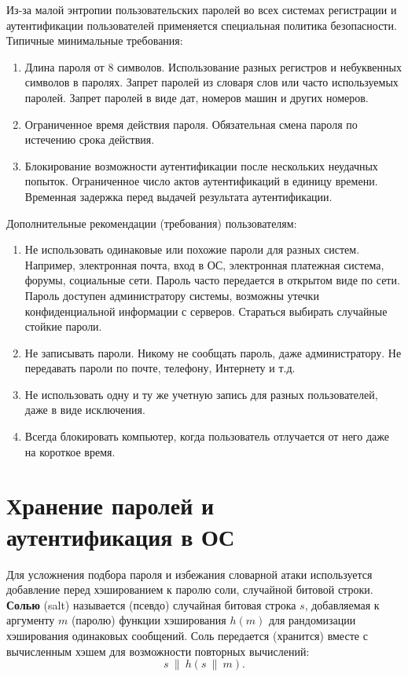 \documentclass[10pt,a4paper]{book}
\begin{document}
Из-за малой энтропии пользовательских паролей во всех системах регистрации и аутентификации пользователей применяется специальная политика безопасности. Типичные минимальные требования:
\begin{enumerate}
    \item Длина пароля от 8 символов. Использование разных регистров и небуквенных символов в паролях. Запрет паролей из словаря слов или часто используемых паролей. Запрет паролей в виде дат, номеров машин и других номеров.
    \item Ограниченное время действия пароля. Обязательная смена пароля по истечению срока действия.
    \item Блокирование возможности аутентификации после нескольких неудачных попыток. Ограниченное число актов аутентификаций в единицу времени. Временная задержка перед выдачей результата аутентификации.
\end{enumerate}

Дополнительные рекомендации (требования) пользователям:
\begin{enumerate}
    \item Не использовать одинаковые или похожие пароли для разных систем. Например, электронная почта, вход в ОС, электронная платежная система, форумы, социальные сети. Пароль часто передается в открытом виде по сети. Пароль доступен администратору системы, возможны утечки конфиденциальной информации с серверов. Стараться выбирать случайные стойкие пароли.
    \item Не записывать пароли. Никому не сообщать пароль, даже администратору. Не передавать пароли по почте, телефону, Интернету и т.д.
    \item Не использовать одну и ту же учетную запись для разных пользователей, даже в виде исключения.
    \item Всегда блокировать компьютер, когда пользователь отлучается от него даже на короткое время.
\end{enumerate}


\section[Хранение паролей и аутентификация в ОС]{Хранение паролей и \protect\\ аутентификация в ОС}

Для усложнения подбора пароля и избежания словарной атаки используется добавление перед хэшированием к паролю соли, случайной битовой строки. \textbf{Солью} (salt) называется (псевдо) случайная битовая строка $s$, добавляемая к аргументу $m$ (паролю) функции хэширования $h(m)$ для рандомизации хэширования одинаковых сообщений. Соль передается (хранится) вместе с вычисленным хэшем для возможности повторных вычислений:
    \[ s ~\|~ h(s ~\|~ m). \]
\end{document}
